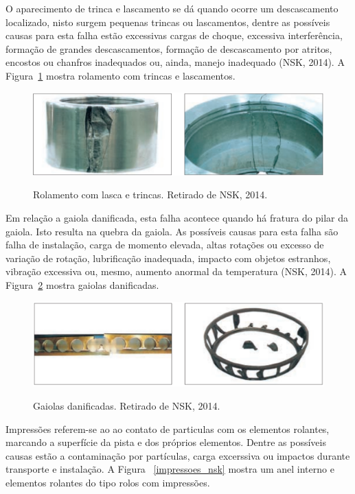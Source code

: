 \documentclass[
	12pt,				
	oneside,			
	a4paper,			
	english,			
	brazil,			
	]{abntex2ppgsi}
\begin{document}
O aparecimento de trinca e lascamento se dá quando ocorre um descascamento localizado, nisto surgem pequenas trincas ou lascamentos, dentre as possíveis causas para esta falha estão excessivas cargas de choque, excessiva interferência, formação de grandes descascamentos, formação de descascamento por atritos, encostos ou chanfros inadequados ou, ainda, manejo inadequado (NSK, 2014). A Figura~\ref{trinca_nsk} mostra rolamento com trincas e lascamentos. 

\begin{figure}[H]
\centering
\caption {Rolamento com lasca e trincas. Retirado de NSK, 2014.}
\includegraphics[width=\textwidth,height=\textheight,keepaspectratio]{trinca_nsk}
\label{trinca_nsk}
\end{figure}

Em relação a gaiola danificada, esta falha acontece quando há fratura do pilar da gaiola. Isto resulta na quebra da gaiola. As possíveis causas para esta falha são falha de instalação, carga de momento elevada, altas rotações ou excesso de variação de rotação, lubrificação inadequada, impacto com objetos estranhos, vibração excessiva ou, mesmo, aumento anormal da temperatura (NSK, 2014). A Figura~\ref{gaiola_nsk} mostra gaiolas danificadas. 

\begin{figure}[H]
\centering
\caption {Gaiolas danificadas. Retirado de NSK, 2014.}
\includegraphics[width=\textwidth,height=\textheight,keepaspectratio]{gaiola_nsk}
\label{gaiola_nsk}
\end{figure}

Impressões referem-se ao ao contato de particulas com os elementos rolantes, marcando a superfície da pista e dos próprios elementos. Dentre as possíveis causas estão a contaminação por partículas, carga excerssiva ou impactos durante transporte e instalação. A Figura ~\ref{impressoes_nsk} mostra um anel interno e elementos rolantes do tipo rolos com impressões.
\end{document}
